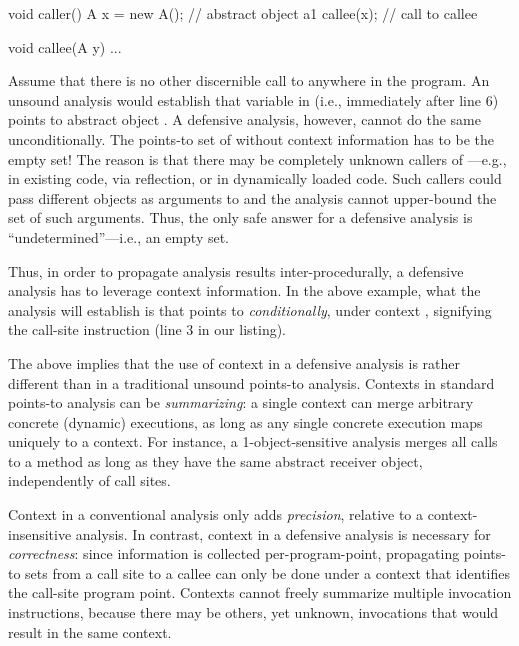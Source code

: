 \vspace{-3mm}\begin{minipage}[l]{5.1in}
\begin{javacode}
void caller() { 
  A x = new A(); // abstract object a1
  callee(x); // call to callee
}

void callee(A y) {
  ...
}
\end{javacode}
\end{minipage}

Assume that there is no other discernible call to  anywhere in the
program. An unsound analysis would establish that variable  in
 (i.e., immediately after line 6) points to abstract object
. A defensive analysis, however, cannot do the same
unconditionally. The points-to set of  without context
information has to be the empty set! The reason is that there may be
completely unknown callers of ---e.g., in existing code, via
reflection, or in dynamically loaded code. Such callers could pass
different objects as arguments to  and the analysis cannot
upper-bound the set of such arguments. Thus, the only safe answer for
a defensive analysis is ``undetermined''---i.e., an empty set.

Thus, in order to propagate analysis results inter-procedurally, a defensive
analysis has to leverage context information. In the above
example, what the analysis will establish is that  points to
 \emph{conditionally}, under context , signifying the
call-site instruction (line 3 in our listing). 

The above implies that the use of context in a defensive analysis is
rather different than in a traditional unsound points-to analysis.
Contexts in standard points-to analysis can be \emph{summarizing}: a
single context can merge arbitrary concrete (dynamic) executions, as
long as any single concrete execution maps uniquely to a context. For
instance, a 1-object-sensitive analysis \cite{article:2005:Milanova} merges all
calls to a method as long as they have the same abstract receiver
object, independently of call sites.

Context in a conventional analysis only adds \emph{precision},
relative to a context-insensitive analysis. In contrast, context in a
defensive analysis is necessary for \emph{correctness}: since
information is collected per-program-point, propagating points-to sets
from a call site to a callee can only be done under a context that
identifies the call-site program point. Contexts cannot freely
summarize multiple invocation instructions, because there may be
others, yet unknown, invocations that would result in the same
context.

